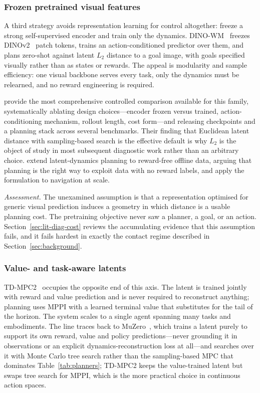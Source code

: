 \documentclass[11pt,letterpaper]{article}
\begin{document}
\subsubsection{Frozen pretrained visual features}

A third strategy avoids representation learning for control altogether: freeze a
strong self-supervised encoder and train only the dynamics.
DINO-WM~\citep{zhou2024dinowm} freezes DINOv2~\citep{oquab2024dinov2} patch
tokens, trains an action-conditioned predictor over them, and plans zero-shot
against latent $L_2$ distance to a goal image, with goals specified visually
rather than as states or rewards. The appeal is modularity and sample
efficiency: one visual backbone serves every task, only the dynamics must be
relearned, and no reward engineering is required.

\citet{jepawms2025} provide the most comprehensive controlled comparison
available for this family, systematically ablating design choices---encoder
frozen versus trained, action-conditioning mechanism, rollout length, cost
form---and releasing checkpoints and a planning stack across several benchmarks.
Their finding that Euclidean latent distance with sampling-based search is the
effective default is why $L_2$ is the object of study in most subsequent
diagnostic work rather than an arbitrary choice. \citet{sobal2025pldm} extend
latent-dynamics planning to reward-free offline data, arguing that planning is
the right way to exploit data with no reward labels, and \citet{nwm2024} apply
the formulation to navigation at scale.

\emph{Assessment.} The unexamined assumption is that a representation optimised
for generic visual prediction induces a geometry in which distance is a usable
planning cost. The pretraining objective never saw a planner, a goal, or an
action. Section~\ref{sec:lit-diag-cost} reviews the accumulating evidence that
this assumption fails, and it fails hardest in exactly the contact regime
described in Section~\ref{sec:background}.

\subsubsection{Value- and task-aware latents}\label{sec:lit-repr-value}

TD-MPC2~\citep{hansen2024tdmpc2} occupies the opposite end of this axis. The
latent is trained jointly with reward and value prediction and is never required
to reconstruct anything; planning uses MPPI with a learned terminal value that
substitutes for the tail of the horizon. The system scales to a single agent
spanning many tasks and embodiments. The line traces back to
MuZero~\citep{schrittwieser2020muzero}, which trains a latent purely to support
its own reward, value and policy predictions---never grounding it in
observations or an explicit dynamics-reconstruction loss at all---and searches
over it with Monte Carlo tree search rather than the sampling-based MPC that
dominates Table~\ref{tab:planners}; TD-MPC2 keeps the value-trained latent but
swaps tree search for MPPI, which is the more practical choice in continuous
action spaces.
\end{document}
